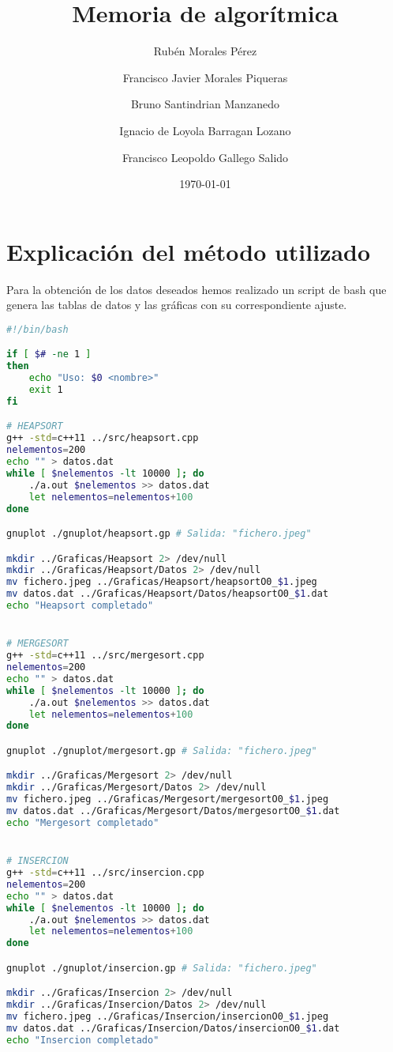 \documentclass[11pt,spanish]{article} %
\title{Memoria de algor\'itmica}
\author{Rubén Morales Pérez 
		\and Francisco Javier Morales Piqueras
		\and Bruno Santindrian Manzanedo 
		\and Ignacio de Loyola Barragan Lozano
		\and Francisco Leopoldo Gallego Salido}
\date{\today}
\begin{document}
 
\maketitle
\tableofcontents %
\newpage
\setlength\parindent{0pt} %



\section{Explicaci\'on del m\'etodo utilizado}
Para la obtenci\'on de los datos deseados hemos realizado un script de bash que genera las tablas de datos y las gráficas con su correspondiente ajuste. 
\begin{lstlisting}[language=bash]
#!/bin/bash

if [ $# -ne 1 ]
then
    echo "Uso: $0 <nombre>"
    exit 1
fi

# HEAPSORT
g++ -std=c++11 ../src/heapsort.cpp
nelementos=200
echo "" > datos.dat
while [ $nelementos -lt 10000 ]; do
    ./a.out $nelementos >> datos.dat
    let nelementos=nelementos+100
done

gnuplot ./gnuplot/heapsort.gp # Salida: "fichero.jpeg"

mkdir ../Graficas/Heapsort 2> /dev/null
mkdir ../Graficas/Heapsort/Datos 2> /dev/null
mv fichero.jpeg ../Graficas/Heapsort/heapsortO0_$1.jpeg
mv datos.dat ../Graficas/Heapsort/Datos/heapsortO0_$1.dat
echo "Heapsort completado"


# MERGESORT
g++ -std=c++11 ../src/mergesort.cpp
nelementos=200
echo "" > datos.dat
while [ $nelementos -lt 10000 ]; do
    ./a.out $nelementos >> datos.dat
    let nelementos=nelementos+100
done

gnuplot ./gnuplot/mergesort.gp # Salida: "fichero.jpeg"

mkdir ../Graficas/Mergesort 2> /dev/null
mkdir ../Graficas/Mergesort/Datos 2> /dev/null
mv fichero.jpeg ../Graficas/Mergesort/mergesortO0_$1.jpeg
mv datos.dat ../Graficas/Mergesort/Datos/mergesortO0_$1.dat
echo "Mergesort completado"


# INSERCION
g++ -std=c++11 ../src/insercion.cpp
nelementos=200
echo "" > datos.dat
while [ $nelementos -lt 10000 ]; do
    ./a.out $nelementos >> datos.dat
    let nelementos=nelementos+100
done

gnuplot ./gnuplot/insercion.gp # Salida: "fichero.jpeg"

mkdir ../Graficas/Insercion 2> /dev/null
mkdir ../Graficas/Insercion/Datos 2> /dev/null
mv fichero.jpeg ../Graficas/Insercion/insercionO0_$1.jpeg
mv datos.dat ../Graficas/Insercion/Datos/insercionO0_$1.dat
echo "Insercion completado"



\end{lstlisting}
\end{document}
